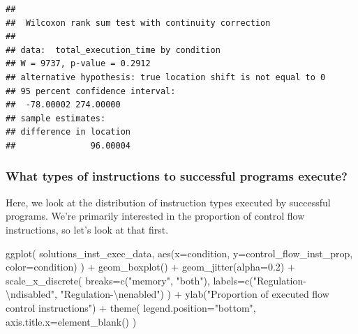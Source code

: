 \documentclass[
]{book}
\newenvironment{Shaded}{\begin{snugshade}}{\end{snugshade}}
\newcommand{\AttributeTok}[1]{\textcolor[rgb]{0.77,0.63,0.00}{#1}}
\newcommand{\FloatTok}[1]{\textcolor[rgb]{0.00,0.00,0.81}{#1}}
\newcommand{\FunctionTok}[1]{\textcolor[rgb]{0.00,0.00,0.00}{#1}}
\newcommand{\NormalTok}[1]{#1}
\newcommand{\SpecialCharTok}[1]{\textcolor[rgb]{0.00,0.00,0.00}{#1}}
\newcommand{\StringTok}[1]{\textcolor[rgb]{0.31,0.60,0.02}{#1}}
\begin{document}
\begin{verbatim}
## 
##  Wilcoxon rank sum test with continuity correction
## 
## data:  total_execution_time by condition
## W = 9737, p-value = 0.2912
## alternative hypothesis: true location shift is not equal to 0
## 95 percent confidence interval:
##  -78.00002 274.00000
## sample estimates:
## difference in location 
##               96.00004
\end{verbatim}

\hypertarget{what-types-of-instructions-to-successful-programs-execute-2}{%
\subsubsection{What types of instructions to successful programs execute?}\label{what-types-of-instructions-to-successful-programs-execute-2}}

Here, we look at the distribution of instruction types executed by successful programs.
We're primarily interested in the proportion of control flow instructions, so let's look at that first.

\begin{Shaded}
\begin{Highlighting}[]
\FunctionTok{ggplot}\NormalTok{( solutions\_inst\_exec\_data, }\FunctionTok{aes}\NormalTok{(}\AttributeTok{x=}\NormalTok{condition, }\AttributeTok{y=}\NormalTok{control\_flow\_inst\_prop, }\AttributeTok{color=}\NormalTok{condition) ) }\SpecialCharTok{+}
  \FunctionTok{geom\_boxplot}\NormalTok{() }\SpecialCharTok{+}
  \FunctionTok{geom\_jitter}\NormalTok{(}\AttributeTok{alpha=}\FloatTok{0.2}\NormalTok{) }\SpecialCharTok{+}
  \FunctionTok{scale\_x\_discrete}\NormalTok{(}
    \AttributeTok{breaks=}\FunctionTok{c}\NormalTok{(}\StringTok{"memory"}\NormalTok{, }\StringTok{"both"}\NormalTok{),}
    \AttributeTok{labels=}\FunctionTok{c}\NormalTok{(}\StringTok{"Regulation{-}}\SpecialCharTok{\textbackslash{}n}\StringTok{disabled"}\NormalTok{, }\StringTok{"Regulation{-}}\SpecialCharTok{\textbackslash{}n}\StringTok{enabled"}\NormalTok{)}
\NormalTok{  ) }\SpecialCharTok{+}
  \FunctionTok{ylab}\NormalTok{(}\StringTok{"Proportion of executed flow control instructions"}\NormalTok{) }\SpecialCharTok{+}
  \FunctionTok{theme}\NormalTok{(}
    \AttributeTok{legend.position=}\StringTok{"bottom"}\NormalTok{,}
    \AttributeTok{axis.title.x=}\FunctionTok{element\_blank}\NormalTok{()}
\NormalTok{  )}
\end{Highlighting}
\end{Shaded}
\end{document}
